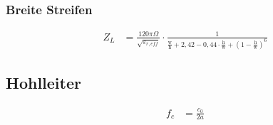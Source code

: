 \subsubsection{Breite Streifen}
\begin{align*}
    Z_L & = \frac{120\pi\Omega}{\sqrt{\varepsilon_{r,eff}}}\cdot\frac{1}{\frac{\text{w}}{\text{h}}+2,42-0,44\cdot\frac{\text{h}}{\text{w}}+\left(1-\frac{\text{h}}{\text{w}}\right)^6}
\end{align*}

\subsection{Hohlleiter}
\begin{align*}
    f_c & = \frac{c_0}{2a}
\end{align*}